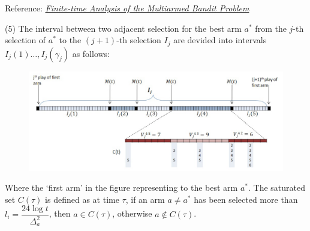 Reference: \href{https://link.springer.com/article/10.1023/A:1013689704352}{\textit{Finite-time Analysis of the Multiarmed Bandit Problem}}

(5) The interval between two adjacent selection for the best arm $a^*$ from the $j$-th selection of $a^*$ to the $(j+1)$-th selection $I_j$ are devided into intervals $I_j(1)\ldots,I_j(\gamma_j)$ as follows:
\begin{figure}[h]
    \centering
    \includegraphics[width=\textwidth]{./figure/TS_proof.png}
\end{figure}

Where the `first arm' in the figure representing to the best arm $a^*$. The saturated set $C(\tau)$ is defined as at time $\tau$, if an arm $a\neq a^*$ has been selected more than $l_i=\dfrac{24\log t}{\Delta_a^2}$, then $a\in C(\tau)$, otherwise $a\notin C(\tau)$.

